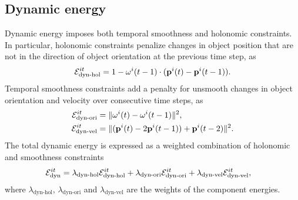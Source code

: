 \documentclass[10pt,twocolumn,letterpaper]{article}
\begin{document}
\begin{comment}
\subsubsection{Lane energy}
\label{sec:laneEnergy}
 The lanes are modeled as splines. Here we assume that the confidence in lane
 detection is decreases as the distance from the lane center increases.  The
 energy is given by the dot product between car orientation and tangent to the
 lane at that point.

\begin{align}
  \label{eq:laneOrientationEnergy}
  \Energy{lane} = 
  \sum_{m \in M_{\text{close}}}
  (1 - \ori{i}{t} \cdot \text{TAN}(L_{m}(k), \pos{i}{t}) )
\LaneUncertainty{\pos{i}{t}}
\end{align}
where $M_{\text{close}} = \{m : \text{DIST}(L_{m}(k), \pos{i}{t}) < d_{\text{thresh}}\} $ is
the set of nearby lanes close to the object by a certain distance threshold $d_{\text{thresh}}$ and 
\begin{align}
\LaneUncertainty{\pos{i}{t}} = 
  \frac{1}{1 + \exp(-q(w_{\text{road}} - \text{DIST}(L_{m}(k), \pos{i}{t})))}
\end{align}
for some constant $w_{\text{road}}$ that represents the width of the road.
\end{comment}

\subsection{Dynamic energy}
Dynamic energy imposes both temporal smoothness and holonomic constraints. In particular, holonomic constraints penalize changes in object position that are not in the direction of object orientation at the previous time step, as
\begin{align}
  \label{eq:totalPosTransitionEnergy}
  \mathcal{E}^{it}_{\text{dyn-hol}} = 1 - \mathbf{\omega}^{i}(t-1) \cdot (\mathbf{p}^{i}({t}) - \mathbf{p}^{i}({t-1})).
\end{align}
Temporal smoothness constraints add a penalty for unsmooth changes in object orientation and velocity over consecutive time steps, as
\begin{align}
  \mathcal{E}^{it}_{\text{dyn-ori}} &= \|\mathbf{\omega}^{i}(t) - \mathbf{\omega}^{i}(t-1)\|^2,\\
  \mathcal{E}^{it}_{\text{dyn-vel}} &= \|(\mathbf{p}^{i}({t}) - 2\mathbf{p}^{i}({t-1})) + \mathbf{p}^{i}({t-2})\|^2.
\end{align}
The total dynamic energy is expressed as a weighted combination of holonomic and smoothness constraints
\begin{align}
  \mathcal{E}^{it}_{\text{dyn}} &= \lambda_{\text{dyn-hol}}\mathcal{E}^{it}_{\text{dyn-hol}} + \lambda_{\text{dyn-ori}}\mathcal{E}^{it}_{\text{dyn-ori}} + \lambda_{\text{dyn-vel}}\mathcal{E}^{it}_{\text{dyn-vel}},
\end{align}
where $\lambda_{\text{dyn-hol}}$, $\lambda_{\text{dyn-ori}}$ and $\lambda_{\text{dyn-vel}}$ are the weights of the component energies.
\end{document}

